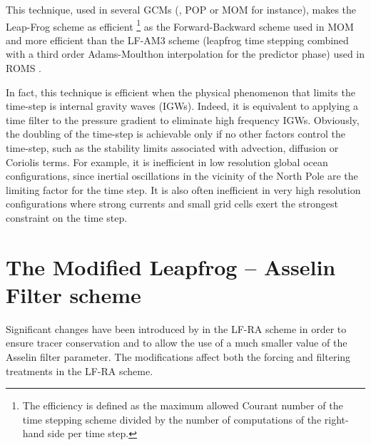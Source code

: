 \documentclass[NEMO_book]{subfiles}
\begin{document}
This technique, used in several GCMs (\NEMO, POP or MOM for instance), 
makes the Leap-Frog scheme as efficient 
\footnote{The efficiency is defined as the maximum allowed Courant number of the time 
stepping scheme divided by the number of computations of the right-hand side per time step.} 
as the Forward-Backward scheme used in MOM \citep{Griffies_al_OS05} and more 
efficient than the LF-AM3 scheme (leapfrog time stepping combined with a third order
Adams-Moulthon interpolation for the predictor phase) used in ROMS 
\citep{Shchepetkin_McWilliams_OM05}. 

In fact, this technique is efficient when the physical phenomenon that 
limits the time-step is internal gravity waves (IGWs). Indeed, it is 
equivalent to applying a time filter to the pressure gradient to eliminate high 
frequency IGWs. Obviously, the doubling of the time-step is achievable only 
if no other factors control the time-step, such as the stability limits associated 
with advection, diffusion or Coriolis terms. For example, it is inefficient in low resolution
global ocean configurations, since inertial oscillations in the vicinity of the North Pole 
are the limiting factor for the time step. It is also often inefficient in very high 
resolution configurations where strong currents and small grid cells exert 
the strongest constraint on the time step.

\section{The Modified Leapfrog -- Asselin Filter scheme}
\label{STP_mLF}

Significant changes have been introduced by \cite{Leclair_Madec_OM09} in the 
LF-RA scheme in order to ensure tracer conservation and to allow the use of 
a much smaller value of the Asselin filter parameter. The modifications affect 
both the forcing and filtering treatments in the LF-RA scheme.
\end{document}
